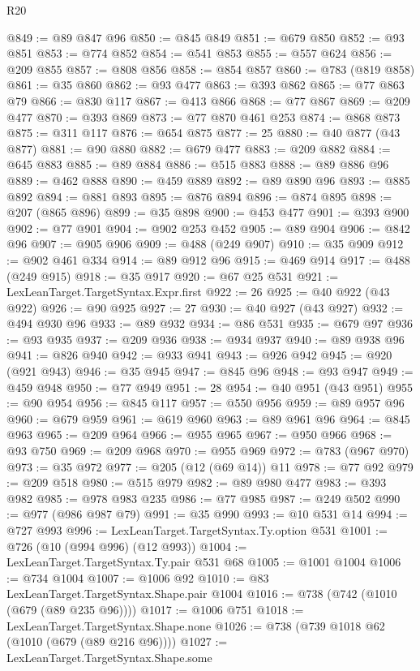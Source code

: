 \begin{lexlean}{R20}
\begin{coremodule}
@849 := @89 @847 @96
@850 := @845 @849
@851 := @679 @850
@852 := @93 @851
@853 := @774 @852
@854 := @541 @853
@855 := @557 @624
@856 := @209 @855
@857 := @808 @856
@858 := @854 @857
@860 := @783 (@819 @858)
@861 := @35 @860
@862 := @93 @477
@863 := @393 @862
@865 := @77 @863 @79
@866 := @830 @117
@867 := @413 @866
@868 := @77 @867
@869 := @209 @477
@870 := @393 @869
@873 := @77 @870 @461 @253
@874 := @868 @873
@875 := @311 @117
@876 := @654 @875
@877 := 25
@880 := @40 @877 (@43 @877)
@881 := @90 @880
@882 := @679 @477
@883 := @209 @882
@884 := @645 @883
@885 := @89 @884
@886 := @515 @883
@888 := @89 @886 @96
@889 := @462 @888
@890 := @459 @889
@892 := @89 @890 @96
@893 := @885 @892
@894 := @881 @893
@895 := @876 @894
@896 := @874 @895
@898 := @207 (@865 @896)
@899 := @35 @898
@900 := @453 @477
@901 := @393 @900
@902 := @77 @901
@904 := @902 @253 @452
@905 := @89 @904
@906 := @842 @96
@907 := @905 @906
@909 := @488 (@249 @907)
@910 := @35 @909
@912 := @902 @461 @334
@914 := @89 @912 @96
@915 := @469 @914
@917 := @488 (@249 @915)
@918 := @35 @917
@920 := @67 @25 @531
@921 := LexLeanTarget.TargetSyntax.Expr.first
@922 := 26
@925 := @40 @922 (@43 @922)
@926 := @90 @925
@927 := 27
@930 := @40 @927 (@43 @927)
@932 := @494 @930 @96
@933 := @89 @932
@934 := @86 @531
@935 := @679 @97
@936 := @93 @935
@937 := @209 @936
@938 := @934 @937
@940 := @89 @938 @96
@941 := @826 @940
@942 := @933 @941
@943 := @926 @942
@945 := @920 (@921 @943)
@946 := @35 @945
@947 := @845 @96
@948 := @93 @947
@949 := @459 @948
@950 := @77 @949
@951 := 28
@954 := @40 @951 (@43 @951)
@955 := @90 @954
@956 := @845 @117
@957 := @550 @956
@959 := @89 @957 @96
@960 := @679 @959
@961 := @619 @960
@963 := @89 @961 @96
@964 := @845 @963
@965 := @209 @964
@966 := @955 @965
@967 := @950 @966
@968 := @93 @750
@969 := @209 @968
@970 := @955 @969
@972 := @783 (@967 @970)
@973 := @35 @972
@977 := @205 (@12 (@69 @14)) @11
@978 := @77 @92
@979 := @209 @518
@980 := @515 @979
@982 := @89 @980 @477
@983 := @393 @982
@985 := @978 @983 @235
@986 := @77 @985
@987 := @249 @502
@990 := @977 (@986 @987 @79)
@991 := @35 @990
@993 := @10 @531 @14
@994 := @727 @993
@996 := LexLeanTarget.TargetSyntax.Ty.option @531
@1001 := @726 (@10 (@994 @996) (@12 @993))
@1004 := LexLeanTarget.TargetSyntax.Ty.pair @531 @68
@1005 := @1001 @1004
@1006 := @734 @1004
@1007 := @1006 @92
@1010 := @83 LexLeanTarget.TargetSyntax.Shape.pair @1004
@1016 := @738 (@742 (@1010 (@679 (@89 @235 @96))))
@1017 := @1006 @751
@1018 := LexLeanTarget.TargetSyntax.Shape.none
@1026 := @738 (@739 @1018 @62 (@1010 (@679 (@89 @216 @96))))
@1027 := LexLeanTarget.TargetSyntax.Shape.some

\end{coremodule}
\end{lexlean}
